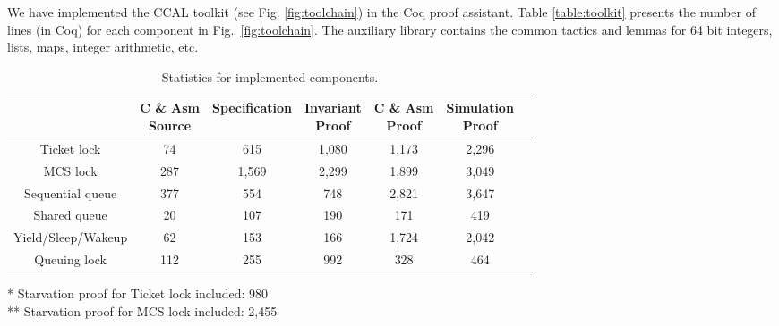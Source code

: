 We have implemented the CCAL toolkit (see Fig. \ref{fig:toolchain}) in the Coq proof assistant. 
Table
\ref{table:toolkit} presents the number of lines (in Coq) for each component in Fig.~\ref{fig:toolchain}. The auxiliary library contains the common
tactics and lemmas for 64 bit integers, lists, maps, integer
arithmetic, {etc}.

\begin{table}
\begin{center}
\renewcommand{\arraystretch}{1.1}
\setlength{\tabcolsep}{0.3em}
\begin{tabular}{|c|c|c|c|c|c|c|}
\hline
 & \makecell{ C \& Asm \\Source} & Specification & \makecell{Invariant \\ Proof} & \makecell{C \& Asm \\Proof} & \makecell{Simulation \\ Proof} \\
\hline
Ticket lock & 74 & 615 & 1,080 & 1,173 & 2,296 \\
\hline
MCS lock & 287 & 1,569 & 2,299  &  1,899 & 3,049 \\
\hline
Sequential queue & 377 & 554 & 748 & 2,821& 3,647 \\
\hline
Shared queue &  20 & 107 & 190 & 171& 419\\
\hline
Yield/Sleep/Wakeup & 62 & 153 & 166 & 1,724 & 2,042 \\
\hline
Queuing lock & 112 & 255 & 992 & 328 & 464\\
\hline
\end{tabular}
\newline
\end{center}
\begin{flushright}
* Starvation proof for Ticket lock included: 980\\
** Starvation proof for MCS lock included: 2,455
\end{flushright}
\caption{Statistics for implemented components.}
\label{table:evaluation}
\hrulefill
\end{table}


